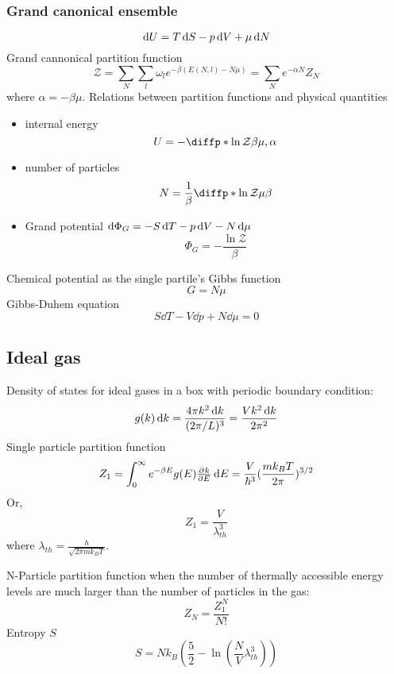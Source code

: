 \documentclass{article}
\begin{document}
\subsubsection{Grand canonical ensemble}
$$\dif U = T\dif S - p\dif V +\mu\dif N$$
Grand cannonical partition function
\begin{equation}
\label{eq:grandCanonicalPartitionFunction}
\mathcal{Z} = \sum_{N}\sum_{l}\omega_l e^{-\beta(E(N,l)-N\mu)}=\sum_{N}e^{-\alpha N}Z_N
\end{equation}
where $\alpha = -\beta\mu$. Relations between partition functions and physical quantities
\begin{itemize}
\item internal energy $$U=-\diffp*{\ln \mathcal{Z}}{\beta}{\mu, \alpha}$$
\item number of particles $$N=\frac{1}{\beta} \diffp*{\ln \mathcal{Z}}{\mu}{\beta}$$
\item Grand potential $\dif \Phi_G=-S\dif T -p\dif V-N\dif\mu$
 $$\Phi_G=-\frac{\ln \mathcal{Z}}{\beta}$$
\end{itemize}
Chemical potential as the single partile's Gibbs function
\begin{equation}
	G = N\mu
\end{equation}
Gibbs-Duhem equation
\begin{equation}
	\label{eq:Gibbs-Duhem-equation}
	S\dd T-V\dd p+N\dd\mu = 0
\end{equation}


\subsection{Ideal gas}
Density of states for ideal gases in a box with periodic boundary condition:
\begin{equation}
g(k)\dif k=\frac{4\pi k^2 \dif k}{(2\pi /L)^3}=\frac{Vk^2 \dif k}{2\pi^2}
\end{equation}
Single particle partition function
\begin{equation}
Z_1=\int_0^{\infty}e^{-\beta E}g(E)\pd{k}{E}\dif E=\frac{V}{\hbar^3}(\frac{mk_BT}{2\pi})^{3/2}
\end{equation}
Or,
\begin{equation}
Z_1=\frac{V}{\lambda_{th}^3}
\end{equation}
where $\lambda_{th}=\frac{h}{\sqrt{2\pi m k_B T}}$.\par
N-Particle partition function when the number of thermally accessible energy levels are much larger than 
the number of particles in the gas:
\begin{equation}
Z_N=\frac{Z_1^N}{N!}
\end{equation}
Entropy $S$
\begin{equation}
S = N k_B(\frac{5}{2}-\ln(\frac{N}{V}\lambda_{th}^3))
\end{equation}
\end{document}

